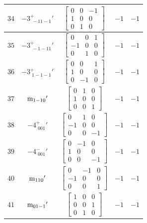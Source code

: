 \documentclass[fleqn,8pt]{jsarticle}
\begin{document}
\begin{longtable}{ccccc}
$ 34 $ & $ -3^{+}_{\,\,-11-1}{}' $ & $ \begin{bmatrix} 0 & 0 & -1 \\ 1 & 0 & 0 \\ 0 & 1 & 0 \end{bmatrix} $ & $ -1 $ & $ -1 $ \\ \hline
$ 35 $ & $ -3^{+}_{\,\,-1-11}{}' $ & $ \begin{bmatrix} 0 & 0 & 1 \\ -1 & 0 & 0 \\ 0 & 1 & 0 \end{bmatrix} $ & $ -1 $ & $ -1 $ \\ \hline
$ 36 $ & $ -3^{+}_{\,\,1-1-1}{}' $ & $ \begin{bmatrix} 0 & 0 & 1 \\ 1 & 0 & 0 \\ 0 & -1 & 0 \end{bmatrix} $ & $ -1 $ & $ -1 $ \\ \hline
$ 37 $ & $ {\rm m}_{1-10}{}' $ & $ \begin{bmatrix} 0 & 1 & 0 \\ 1 & 0 & 0 \\ 0 & 0 & 1 \end{bmatrix} $ & $ -1 $ & $ -1 $ \\ \hline
$ 38 $ & $ -4^{+}_{\,\,001}{}' $ & $ \begin{bmatrix} 0 & 1 & 0 \\ -1 & 0 & 0 \\ 0 & 0 & -1 \end{bmatrix} $ & $ -1 $ & $ -1 $ \\ \hline
$ 39 $ & $ -4^{-}_{\,\,001}{}' $ & $ \begin{bmatrix} 0 & -1 & 0 \\ 1 & 0 & 0 \\ 0 & 0 & -1 \end{bmatrix} $ & $ -1 $ & $ -1 $ \\ \hline
$ 40 $ & $ {\rm m}_{110}{}' $ & $ \begin{bmatrix} 0 & -1 & 0 \\ -1 & 0 & 0 \\ 0 & 0 & 1 \end{bmatrix} $ & $ -1 $ & $ -1 $ \\ \hline
$ 41 $ & $ {\rm m}_{01-1}{}' $ & $ \begin{bmatrix} 1 & 0 & 0 \\ 0 & 0 & 1 \\ 0 & 1 & 0 \end{bmatrix} $ & $ -1 $ & $ -1 $ \\ \hline

\end{longtable}
\end{document}
